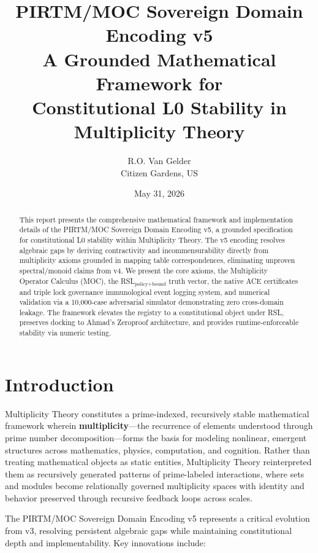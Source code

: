 \documentclass[11pt,a4paper]{article}
\title{\textbf{PIRTM/MOC Sovereign Domain Encoding v5}\\[0.5em]
\large A Grounded Mathematical Framework for \\ Constitutional L0 Stability in Multiplicity Theory}
\author{R.O. Van Gelder\\Citizen Gardens, US}
\date{May 31, 2026}
\begin{document}
\maketitle

\begin{abstract}
This report presents the comprehensive mathematical framework and implementation details of the PIRTM/MOC Sovereign Domain Encoding v5, a grounded specification for constitutional L0 stability within Multiplicity Theory. The v5 encoding resolves algebraic gaps by deriving contractivity and incommensurability directly from multiplicity axioms grounded in mapping table correspondences, eliminating unproven spectral/monoid claims from v4. We present the core axioms, the Multiplicity Operator Calculus (MOC), the RSL$_{\text{policy+bound}}$ truth vector, the native ACE certificates and triple lock governance immunological event logging system, and numerical validation via a 10,000-case adversarial simulator demonstrating zero cross-domain leakage. The framework elevates the registry to a constitutional object under RSL, preserves docking to Ahmad's Zeroproof architecture, and provides runtime-enforceable stability via numeric testing.
\end{abstract}
\newpage
\tableofcontents
\newpage

\section{Introduction}

Multiplicity Theory constitutes a prime-indexed, recursively stable mathematical framework wherein \textbf{multiplicity}---the recurrence of elements understood through prime number decomposition---forms the basis for modeling nonlinear, emergent structures across mathematics, physics, computation, and cognition. Rather than treating mathematical objects as static entities, Multiplicity Theory reinterpreted them as recursively generated patterns of prime-labeled interactions, where sets and modules become relationally governed multiplicity spaces with identity and behavior preserved through recursive feedback loops across scales.

The PIRTM/MOC Sovereign Domain Encoding v5 represents a critical evolution from v3, resolving persistent algebraic gaps while maintaining constitutional depth and implementability. Key innovations include:
\end{document}
